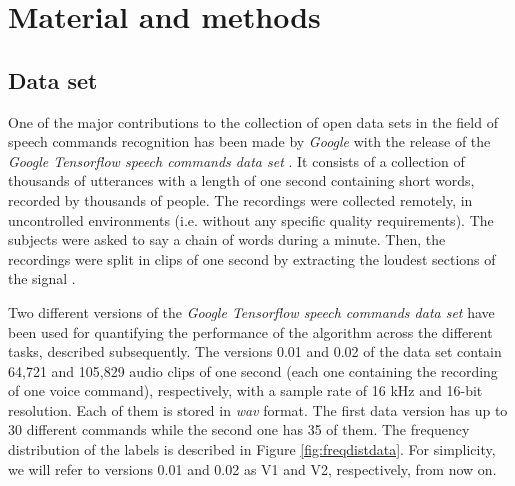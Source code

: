 \documentclass{elsarticle}
\begin{document}
 \section{Material and methods} \label{sec:MM} 

\subsection{Data set}
One of the major contributions to the collection of open data sets in the field of speech commands recognition has been made by \textit{Google} with the release of the \textit{Google Tensorflow speech commands data set} \cite{speechcommands, Warden2018}. It consists of a collection of thousands of utterances with a length of one second containing short words, recorded by thousands of people. The recordings were collected remotely, in uncontrolled environments (i.e. without any specific quality requirements). The subjects were asked to say a chain of words during a minute. Then, the recordings were split in clips of one second by extracting the loudest sections of the signal \cite{speechcommands, Warden2018}.

Two different versions of the \textit{Google Tensorflow speech commands data set} have been used for quantifying the performance of the algorithm across the different tasks, described subsequently. The versions 0.01 and 0.02 of the data set contain 64,721 and 105,829 audio clips of one second (each one containing the recording of one voice command), respectively, with a sample rate of 16 kHz and 16-bit resolution. Each of them is stored in \textit{wav} format. The first data version has up to 30 different commands while the second one has 35 of them. The frequency distribution of the labels is described in Figure \ref{fig:freqdistdata}. For simplicity, we will refer to versions 0.01 and 0.02 as V1 and V2, respectively, from now on.
\end{document}
